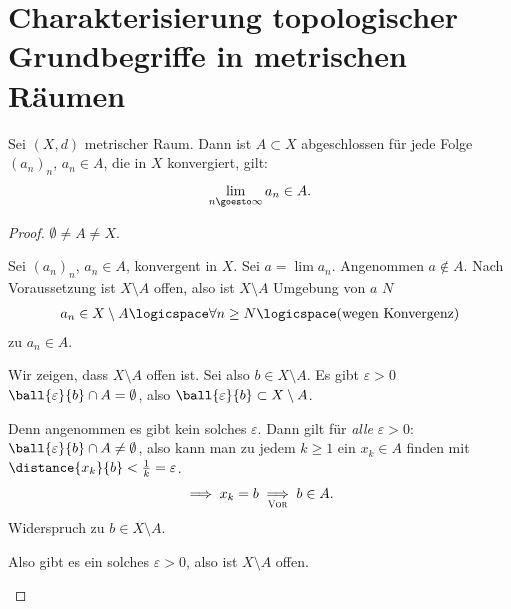 \section{Charakterisierung topologischer Grundbegriffe in metrischen Räumen}
\begin{lemma}\label{abgeschlossenheit:folgenkonvergenzkriterium}
    Sei \( (X,d) \) metrischer Raum. 
    Dann ist \( A\subset X \) abgeschlossen \tiff für jede Folge \( (a_n)_n \), \( a_n\in A \), die in \( X \) konvergiert, gilt:
    \begin{align*}
        \lim\limits_{n \goesto \infty} a_n\in A.
    \end{align*}
\end{lemma}
\begin{proof}
    \Obda \( \emptyset\neq A\neq X \).
    
    \begin{proofenumerate}
        
        \item[\hin] Sei \( (a_n)_n \), \( a_n\in A \), konvergent in \( X \).
         Sei \( a=\lim a_n \). Angenommen \( a\notin A \). Nach Voraussetzung ist \( X\setminus A \) offen, also ist \( X\setminus A \) Umgebung von \( a \) \timplies \texists \( N \) \sd
         \begin{align*}
             a_n \in X\setminus A \logicspace \forall n\geq N \logicspace (\text{wegen Konvergenz})
         \end{align*}
         \contra zu \( a_n\in A \).
         
         \item[\rueck] Wir zeigen, dass \( X\setminus A \) offen ist.
         Sei also \( b\in X \setminus A \). Es gibt \( \varepsilon>0 \) \sd \( \ball{\varepsilon}{b}\cap A=\emptyset \), also \( \ball{\varepsilon}{b}\subset X\setminus A \). 
         
         Denn angenommen es gibt kein solches \( \varepsilon \). 
         Dann gilt für \emph{alle} \( \varepsilon>0 \):
         \( \ball{\varepsilon}{b}\cap A\neq \emptyset \), also kann man zu jedem \( k\geq 1 \) ein \( x_k\in A \) finden mit \( \distance{x_k}{ b}<\frac{1}{k}=\varepsilon \).
         \begin{align*}
             \implies x_k=b\underset{\text{\textsc{Vor}}}{\implies} b\in A.
         \end{align*}
         \contra Widerspruch zu \( b\in X\setminus A \).

         Also gibt es ein solches \( \varepsilon>0 \), also ist \( X\setminus A \) offen.
    \end{proofenumerate}
    
\end{proof}
